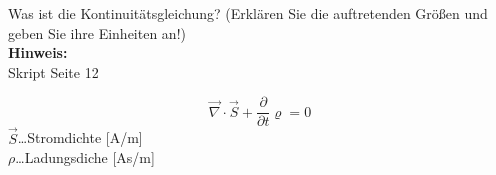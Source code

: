 \begin{question}[section=2,name={Koninutätsgleichung},difficulty=,quantity=1,type=thr,tags={20160310,20130513}]
	Was ist die Kontinuitätsgleichung? (Erklären Sie die auftretenden Größen und geben Sie ihre Einheiten an!)
	\\ \textbf{Hinweis:}\\
	Skript Seite 12
\end{question}
\begin{solution}
	\begin{equation}
	\vec{\nabla} \cdot \vec{S} + \frac{\partial}{\partial t} \varrho = 0
\end{equation}
	$\vec{S}$\dots Stromdichte [A/m]\\
	$\rho$\dots Ladungsdiche [As/m]
\end{solution}